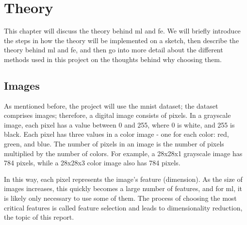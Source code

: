 \chapter{Theory}\label{cha:theory}
This chapter will discuss the theory behind \gls{ml} and \gls{fe}. We will briefly introduce the steps in how the theory will be implemented on a sketch, then describe the theory behind \gls{ml} and \gls{fe}, and then go into more detail about the different methods used in this project on the thoughts behind why choosing them.

\section{Images}\label{sec:images}
As mentioned before, the project will use the \gls{mnist} dataset; the dataset comprises images; therefore, a digital image consists of pixels. In a grayscale image, each pixel has a value between 0 and 255, where 0 is white, and 255 is black. Each pixel has three values in a color image - one for each color: red, green, and blue. The number of pixels in an image is the number of pixels multiplied by the number of colors. For example, a 28x28x1 grayscale image has 784 pixels, while a 28x28x3 color image also has 784 pixels.

In this way, each pixel represents the image's feature (dimension). As the size of images increases, this quickly becomes a large number of features, and for \gls{ml}, it is likely only necessary to use some of them. The process of choosing the most critical features is called feature selection and leads to dimensionality reduction, the topic of this report.




